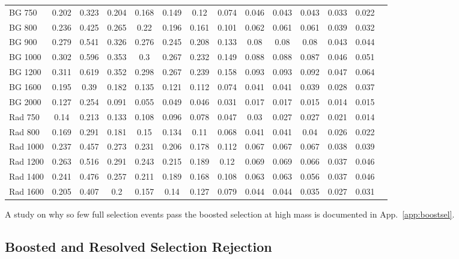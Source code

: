 \begin{table}[h]
{\begin{tabular}{|l|c|c|c|c|c|c|c|c|c|c|c|c|c|}
BG 750 & 0.202 & 0.323 & 0.204 & 0.168 & 0.149 & 0.12 & 0.074 & 0.046 & 0.043 & 0.043 & 0.033 & 0.022\\
BG 800 & 0.236 & 0.425 & 0.265 & 0.22 & 0.196 & 0.161 & 0.101 & 0.062 & 0.061 & 0.061 & 0.039 &0.032\\
BG 900 & 0.279 & 0.541 & 0.326 & 0.276 & 0.245 & 0.208 & 0.133 & 0.08 & 0.08 & 0.08 & 0.043 &0.044\\
BG 1000 & 0.302 & 0.596 & 0.353 & 0.3 & 0.267 & 0.232 & 0.149 & 0.088 & 0.088 & 0.087 & 0.046 &0.051\\
BG 1200 & 0.311 & 0.619 & 0.352 & 0.298 & 0.267 & 0.239 & 0.158 & 0.093 & 0.093 & 0.092 & 0.047 &0.064\\
BG 1600 & 0.195 & 0.39 & 0.182 & 0.135 & 0.121 & 0.112 & 0.074 & 0.041 & 0.041 & 0.039 & 0.028 &0.037\\
BG 2000 & 0.127 & 0.254 & 0.091 & 0.055 & 0.049 & 0.046 & 0.031 & 0.017 & 0.017 & 0.015 & 0.014 &0.015\\ \hline
Rad 750 & 0.14 & 0.213 & 0.133 & 0.108 & 0.096 & 0.078 & 0.047 & 0.03 & 0.027 & 0.027 & 0.021 &0.014\\
Rad 800 & 0.169 & 0.291 & 0.181 & 0.15 & 0.134 & 0.11 & 0.068 & 0.041 & 0.041 & 0.04 & 0.026 &0.022\\
Rad 1000 & 0.237 & 0.457 & 0.273 & 0.231 & 0.206 & 0.178 & 0.112 & 0.067 & 0.067 & 0.067 & 0.038 &0.039\\
Rad 1200 & 0.263 & 0.516 & 0.291 & 0.243 & 0.215 & 0.189 & 0.12 & 0.069 & 0.069 & 0.066 & 0.037 & 0.046\\
Rad 1400 & 0.241 & 0.476 & 0.257 & 0.211 & 0.189 & 0.168 & 0.108 & 0.063 & 0.063 & 0.056 & 0.037 & 0.046 \\
Rad 1600 & 0.205 & 0.407 & 0.2 & 0.157 & 0.14 & 0.127 & 0.079 & 0.044 & 0.044 & 0.035 & 0.027 &0.031\\
\hline
\end{tabular}
}
\end{table}

A study on why so few full selection events pass the boosted selection at high mass is documented in App.~\ref{app:boostsel}.

\subsection{Boosted and Resolved Selection Rejection\label{ss:boostres}}

